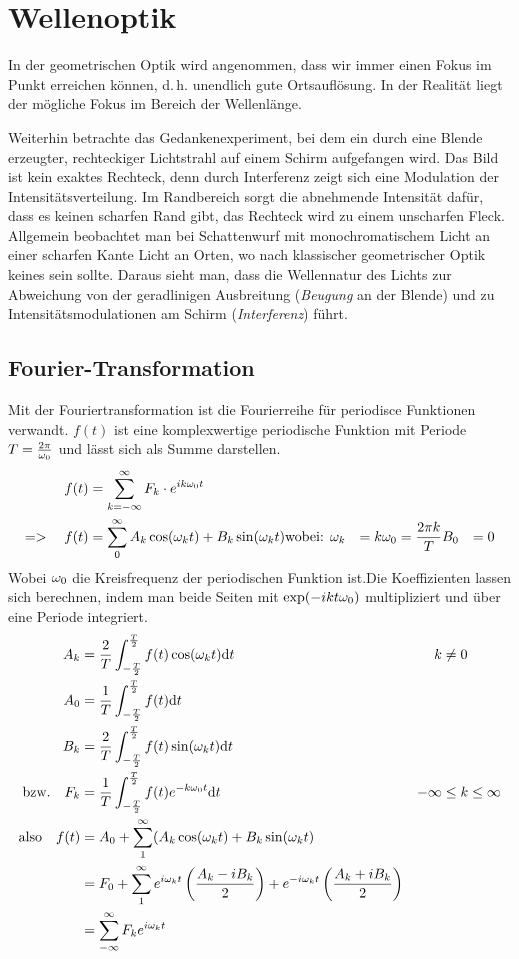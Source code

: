 \chapter{Wellenoptik}
In der geometrischen Optik wird angenommen, dass wir immer einen
Fokus im Punkt erreichen können, d.\,h. unendlich gute Ortsauflösung.
In der Realität liegt der mögliche Fokus im Bereich der Wellenlänge.

Weiterhin betrachte das Gedankenexperiment, bei dem ein durch eine Blende
erzeugter, rechteckiger Lichtstrahl auf einem Schirm aufgefangen wird.
Das Bild ist kein exaktes Rechteck, denn durch Interferenz zeigt sich
eine Modulation der Intensitätsverteilung. Im Randbereich sorgt die
abnehmende Intensität dafür, dass es keinen scharfen Rand gibt, das
Rechteck wird zu einem unscharfen Fleck.
Allgemein beobachtet man bei Schattenwurf mit monochromatischem Licht
an einer scharfen Kante Licht an Orten, wo nach klassischer
geometrischer Optik keines sein sollte.
Daraus sieht man, dass die Wellennatur des Lichts zur
Abweichung von der geradlinigen Ausbreitung (\emph{Beugung} an
der Blende) und zu Intensitätsmodulationen am Schirm
(\emph{Interferenz}) führt.

\section{Fourier-Transformation}
Mit der Fouriertransformation ist die Fourierreihe für periodisce Funktionen verwandt.
$f(t)$ ist eine komplexwertige periodische Funktion mit Periode $T=\frac{2\pi}{\omega_0}$ und lässt sich als Summe darstellen.
\begin{align*}
	f(t)&=\sum_{k=-\infty}^{\infty} F_k\cdot e^{ik\omega_0 t}\\
	=>\quad f(t)&=\sum_0^{\infty} A_k\cos(\omega_k t)+B_k\sin(\omega_k t)
	\text{wobei: }\omega_k&=k\omega_0=\frac{2\pi k}{T}&B_0&=0
\end{align*}
Wobei $\omega_0$ die Kreisfrequenz der periodischen Funktion ist.Die Koeffizienten lassen sich berechnen, indem man beide Seiten mit $\exp(-ikt\omega_0)$ multipliziert und über eine Periode integriert.
\begin{align*}
	A_k&=\frac{2}{T}\int_{-\frac{T}{2}}^{\frac{T}{2}}f(t)\cos(\omega_k t)\mathrm{d} t&k&\neq 0\\
	A_0&=\frac{1}{T}\int_{-\frac{T}{2}}^{\frac{T}{2}}f(t)\mathrm{d} t\\
	B_k&=\frac{2}{T}\int_{-\frac{T}{2}}^{\frac{T}{2}}f(t)\sin(\omega_k t)\mathrm{d} t\\
	\text{bzw.}\quad F_k&=\frac{1}{T}\int_{-\frac{T}{2}}^{\frac{T}{2}}f(t) e^{-k\omega_0 t}\mathrm{d} t&-\infty&\leq k\leq\infty\\
	\text{also}\quad f(t)&=A_0+\sum_{1}^{\infty}(A_k\cos(\omega_k t)+B_k\sin(\omega_k t)\\
	&=F_0+\sum_{1}^{\infty}e^{i\omega_kt}\left(\frac{A_k-iB_k}{2}\right)+e^{-i\omega_kt}\left(\frac{A_k+iB_k}{2}\right)\\
	&=\sum_{-\infty}^{\infty}F_ke^{i\omega_k t}
\end{align*}
